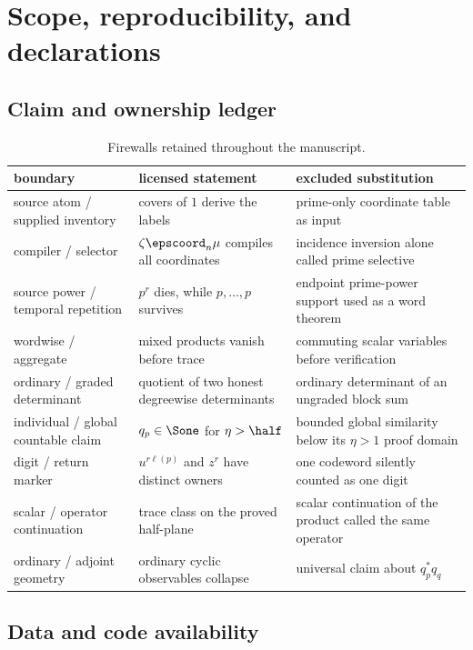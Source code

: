 \section{Scope, reproducibility, and declarations}
\label{app:scope}

\subsection{Claim and ownership ledger}

\begin{table}[htbp]
\centering
\small
\caption{Firewalls retained throughout the manuscript.}
\label{tab:ownership-ledger}
\begin{tabularx}{\textwidth}{L{39mm} Y Y}
\toprule
boundary & licensed statement & excluded substitution \\
\midrule
source atom / supplied inventory
& covers of \(1\) derive the labels
& prime-only coordinate table as input \\
compiler / selector
& \(\zeta\epscoord_n\mu\) compiles all coordinates
& incidence inversion alone called prime selective \\
source power / temporal repetition
& \(p^r\) dies, while \(p,\ldots,p\) survives
& endpoint prime-power support used as a word theorem \\
wordwise / aggregate
& mixed products vanish before trace
& commuting scalar variables before verification \\
ordinary / graded determinant
& quotient of two honest degreewise determinants
& ordinary determinant of an ungraded block sum \\
individual / global countable claim
& \(q_p\in\Sone\) for \(\eta>\half\)
& bounded global similarity below its \(\eta>1\) proof domain \\
digit / return marker
& \(u^{r\ell(p)}\) and \(z^r\) have distinct owners
& one codeword silently counted as one digit \\
scalar / operator continuation
& trace class on the proved half-plane
& scalar continuation of the product called the same operator \\
ordinary / adjoint geometry
& ordinary cyclic observables collapse
& universal claim about \(q_p^*q_q\) \\
\bottomrule
\end{tabularx}
\end{table}

\subsection{Data and code availability}

